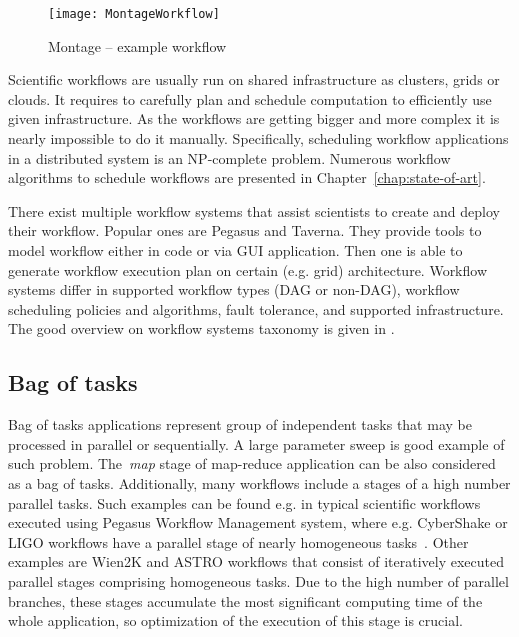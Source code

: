 \begin{figure}[tb]
   \centering
   \texttt{[image: MontageWorkflow]}  
   \caption{Montage – example workflow\cite{Bharathi08}}
   \label{fig:intro:workflow}
\end{figure} 

Scientific workflows are usually run on shared infrastructure as clusters, grids or clouds. It requires to carefully plan and schedule computation to efficiently use given infrastructure. As the workflows are getting bigger and more complex it is nearly impossible to do it manually. Specifically, scheduling workflow applications in a distributed system is an NP-complete problem\cite{Garey:1979:CIG:578533}. Numerous workflow algorithms to schedule workflows are presented in Chapter \ref{chap:state-of-art}.

There exist multiple workflow systems that assist scientists to create and deploy their workflow. Popular ones are Pegasus\cite{Pegasus} and Taverna\cite{Taverna}. They provide tools to model workflow either in code or via GUI application. Then one is able to generate workflow execution plan on certain (e.g. grid) architecture. Workflow systems differ in supported workflow types (DAG or non-DAG), workflow scheduling policies and algorithms, fault tolerance, and supported infrastructure. The good overview on workflow systems taxonomy is given in \cite{Yu:2005:TSW:1084805.1084814}.

\subsection{Bag of tasks}

Bag of tasks applications represent group of independent tasks that may be processed in parallel or sequentially. A large parameter sweep is good example of such problem. The \emph{map} stage of map-reduce\cite{Dean:2008:MapReduce}  application can be also considered as a bag of tasks. Additionally, many workflows include a stages of a high number parallel tasks. Such examples can be found e.g. in typical scientific workflows executed using Pegasus Workflow Management system, where e.g. CyberShake or LIGO workflows have a parallel stage of nearly homogeneous tasks~\cite{Bharathi08}. Other examples are Wien2K and ASTRO workflows that consist of iteratively executed parallel stages comprising homogeneous tasks\cite{Duan12}. Due to the high number of parallel branches, these stages accumulate the most significant computing time of the whole application, so optimization of the execution of this stage is crucial.


